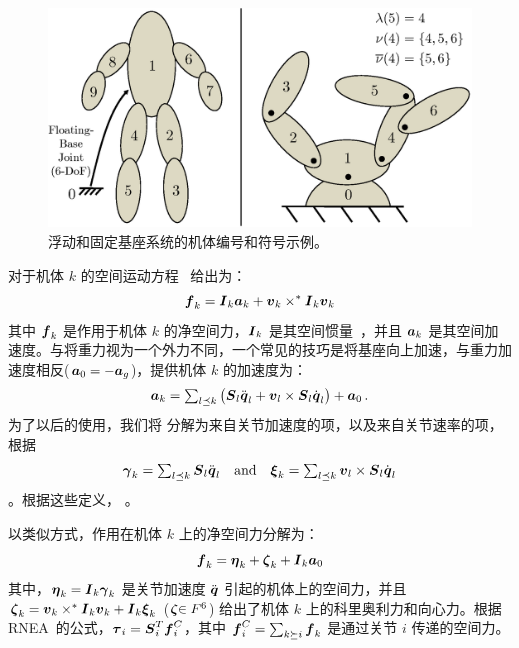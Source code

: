 \documentclass[letterpaper, 10 pt, conference]{ieeetran}  %
\begin{document}
\begin{figure}[tb]
\centering
\includegraphics[width=.85 \columnwidth]{FloatFix.eps}
\caption{浮动和固定基座系统的机体编号和符号示例。}
\label{link_fig}
\end{figure}

\vspace{1ex}
 对于机体 $k$ 的空间运动方程~\cite{rbd} 给出为：
\begin{equation}
    \f_{k}= \I_{k}\a_{k} + \v_{k} \times^*\I_{k} \v_{k}
    \label{eq:spatial_eom}
\end{equation}
其中 $\boldsymbol{f}_{k}$ 是作用于机体 $k$ 的净空间力，$\boldsymbol{I}{}_{k}$ 是其空间惯量~\cite{rbd}，并且 $\boldsymbol{a}_{k}$ 是其空间加速度。与将重力视为一个外力不同，一个常见的技巧是将基座向上加速，与重力加速度相反($\boldsymbol{a}_{0} = -\boldsymbol{a}_{g}$)，提供机体 $k$ 的加速度为：
\begin{equation}
    \a_{k} = \textstyle\sum_{l \preceq k} \red{\big(} \red{\Phibar_{l}} \qdd_{l} + \v_{l} \times \red{\Phibar_{l}} \qd_{l} \red{\big)}+\a_{0}\,.
    \label{spatial_acc}
\end{equation}
为了以后的使用，我们将  分解为来自关节加速度的项，以及来自关节速率的项，根据
\[
 \boldsymbol{\gamma}_{k} = \textstyle \sum_{l \preceq k} {\color{black}\boldsymbol{S}_{l}} \ddot{\boldsymbol{q}}_{l}
\textrm{~~~and~~~}
\boldsymbol{\xi}_{k} = \textstyle \sum_{l \preceq k} \boldsymbol{v}_{l} \times {\color{black}\boldsymbol{S}_{l}} \dot{\boldsymbol{q}}_{l}  
\]
。根据这些定义， 。


以类似方式，作用在机体 $k$ 上的净空间力分解为：
\begin{equation}
    \f_{k}=\etabar_{k} + \zetabar_{k}+\I_{k}\a_{0}
    \label{f_defn}
\end{equation}
其中，$\boldsymbol{\eta}_{k} = \boldsymbol{I}{}_{k} \boldsymbol{\gamma}_{k}$  是关节加速度 $\ddot{\boldsymbol{q}}$ 引起的机体上的空间力，并且 $\boldsymbol{\zeta}_{k} = \boldsymbol{v}_{k} \times^{*}\boldsymbol{I}{}_{k} \boldsymbol{v}_{k} + \boldsymbol{I}{}_{k} \boldsymbol{\xi}_{k}$ ($\boldsymbol{\zeta} {\color{black}\in F^{6}}$)  给出了机体 $k$ 上的科里奥利力和向心力。根据RNEA~\cite{rbd}的公式，${\color{black}\boldsymbol{\tau}_{i}} = \boldsymbol{S}_{i}^{T}\boldsymbol{f}_{i}^{C} $，其中 $\boldsymbol{f}_{i}^{C}=\sum_{k \succeq i} \boldsymbol{f}_{k}$ 是通过关节 $i$ 传递的空间力。
\end{document}
